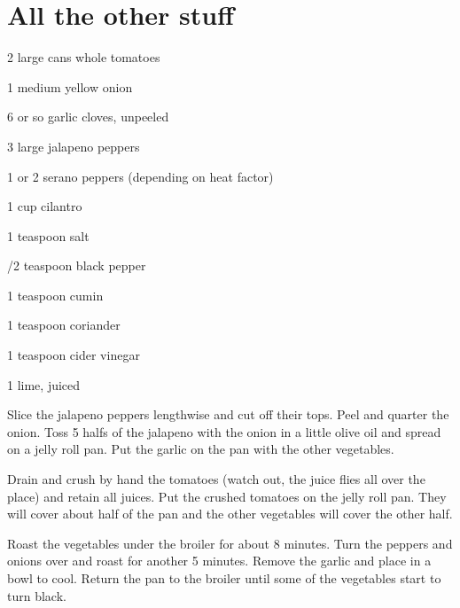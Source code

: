 \chapter{All the other stuff}


%
%
%
%
\newpage



\begin{IngredientsAndSteps}
    \ListIngredientsAndSteps
    {
        2 large cans whole tomatoes

        1 medium yellow onion

        6 or so garlic cloves, unpeeled

        3 large jalapeno peppers

        1 or 2 serano peppers (depending on heat factor)

        1 cup cilantro

        1 teaspoon salt

        /2 teaspoon black pepper

        1 teaspoon cumin

        1 teaspoon coriander

        1 teaspoon cider vinegar

        1 lime, juiced
    }
    {
        Slice the jalapeno peppers lengthwise and cut off their tops. Peel and
        quarter the onion. Toss 5 halfs of the jalapeno with the onion in a
        little olive oil and spread on a jelly roll pan. Put the garlic on the
        pan with the other vegetables.

        Drain and crush by hand the tomatoes (watch out, the juice flies all
        over the place) and retain all juices. Put the crushed tomatoes on the
        jelly roll pan. They will cover about half of the pan and the other
        vegetables will cover the other half.

        Roast the vegetables under the broiler for about 8 minutes. Turn the
        peppers and onions over and roast for another 5 minutes. Remove the
        garlic and place in a bowl to cool. Return the pan to the broiler until
        some of the vegetables start to turn black.

}
\end{IngredientsAndSteps}
